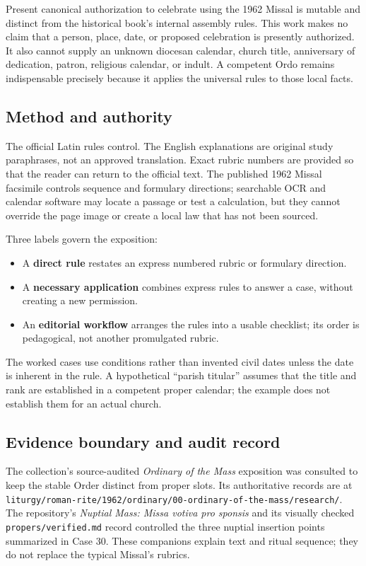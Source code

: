 {Present canonical authorization to celebrate using the 1962 Missal is mutable and distinct from the historical book's internal assembly rules. This work makes no claim that a person, place, date, or proposed celebration is presently authorized. It also cannot supply an unknown diocesan calendar, church title, anniversary of dedication, patron, religious calendar, or indult. A competent Ordo remains indispensable precisely because it applies the universal rules to those local facts.

\subsection{Method and authority}

The official Latin rules control. The English explanations are original study paraphrases, not an approved translation. Exact rubric numbers are provided so that the reader can return to the official text. The published 1962 Missal facsimile controls sequence and formulary directions; searchable OCR and calendar software may locate a passage or test a calculation, but they cannot override the page image or create a local law that has not been sourced.

Three labels govern the exposition:

\begin{itemize}
\item A \textbf{direct rule} restates an express numbered rubric or formulary direction.
\item A \textbf{necessary application} combines express rules to answer a case, without creating a new permission.
\item An \textbf{editorial workflow} arranges the rules into a usable checklist; its order is pedagogical, not another promulgated rubric.
\end{itemize}

The worked cases use conditions rather than invented civil dates unless the date is inherent in the rule. A hypothetical “parish titular” assumes that the title and rank are established in a competent proper calendar; the example does not establish them for an actual church.

\subsection{Evidence boundary and audit record}

The collection's source-audited \emph{Ordinary of the Mass} exposition was consulted to keep the stable Order distinct from proper slots. Its authoritative records are at \nolinkurl{liturgy/roman-rite/1962/ordinary/00-ordinary-of-the-mass/research/}. The repository's \emph{Nuptial Mass: Missa votiva pro sponsis} and its visually checked \nolinkurl{propers/verified.md} record controlled the three nuptial insertion points summarized in Case 30. These companions explain text and ritual sequence; they do not replace the typical Missal's rubrics.

}
